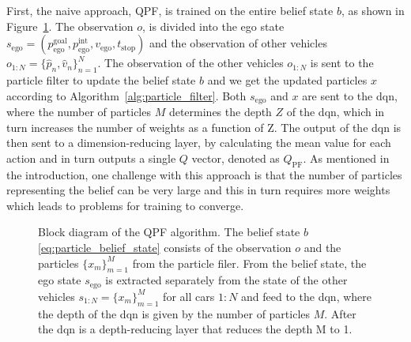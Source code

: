 First, the naive approach, QPF, is trained on the entire belief state $b$, as shown in Figure~\ref{fig:qpf}. The observation $o$, is divided into the ego state $s_\mathrm{ego}= (p_\mathrm{ego}^\mathrm{goal},p_\mathrm{ego}^\mathrm{int}, v_\mathrm{ego}, t_\mathrm{stop})$ and the observation of other vehicles $o_{1:N} = \{\hat p_n,\hat v_n \}_{n=1}^N$. The observation of the other vehicles $o_{1:N}$ is sent to the particle filter to update the belief state $b$ and we get the updated particles $x$ according to Algorithm~\ref{alg:particle_filter}. Both $s_\mathrm{ego}$ and $x$ are sent to the \gls{dqn}, where the number of particles $M$ determines the depth $Z$ of the \gls{dqn}, which in turn increases the number of weights as a function of Z. The output of the \gls{dqn} is then sent to a dimension-reducing layer, by calculating the mean value for each action and in turn outputs a single $Q$ vector, denoted as $Q_\mathrm{PF}$. 
As mentioned in the introduction, one challenge with this approach is that the number of particles representing the belief can be very large and this in turn requires more weights which leads to problems for training to converge. 
\begin{figure}[!h]
    \centering
        
        \caption{Block diagram of the QPF algorithm. 
        The belief state $b$ \eqref{eq:particle_belief_state} consists of the observation $o$ and the particles $\{ x_m \}^M_{m=1}$ from the particle filer. From the belief state, the ego state $s_\mathrm{ego}$ is extracted separately from the state of the other vehicles $s_{1:N}=\{ x_m \}^M_{m=1}$ for all cars $1:N$ and feed to the \gls{dqn}, where the depth of the \gls{dqn} is given by the number of particles $M$. After the \gls{dqn} is a depth-reducing layer that reduces the depth M to 1.}
    \label{fig:qpf}
\end{figure}

